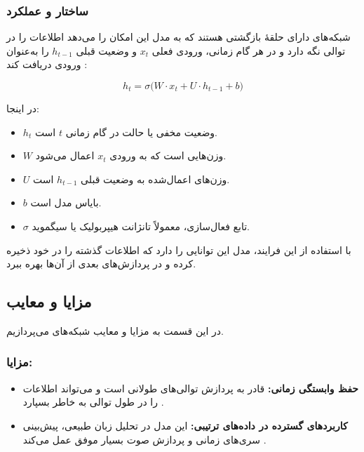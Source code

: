 \subsubsection{ساختار و عملکرد }
شبکه‌های  دارای حلقهٔ بازگشتی هستند که به مدل این امکان را می‌دهد اطلاعات را در توالی نگه دارد و در هر گام زمانی، ورودی فعلی \( x_t \) و وضعیت قبلی \( h_{t-1} \) را به‌عنوان ورودی دریافت کند
\cite{goodfellow2016deep}:

\begin{equation}
	h_t = \sigma \big( W \cdot x_t + U \cdot h_{t-1} + b \big)
\end{equation}

در اینجا:
\begin{itemize}
	\item \( h_t \) وضعیت مخفی یا حالت در گام زمانی \( t \) است.
	\item \( W \) وزن‌هایی است که به ورودی \( x_t \) اعمال می‌شود.
	\item \( U \) وزن‌های اعمال‌شده به وضعیت قبلی \( h_{t-1} \) است.
	\item \( b \) بایاس مدل است.
	\item \( \sigma \) تابع فعال‌سازی، معمولاً تانژانت هیپربولیک یا سیگموید.
\end{itemize}

با استفاده از این فرایند، مدل این توانایی را دارد که اطلاعات گذشته را در خود ذخیره کرده و در پردازش‌های بعدی از آن‌ها بهره ببرد.

\subsection{مزایا و معایب }
در این قسمت به مزایا و معایب شبکه‌های  می‌پردازیم.

\subsubsection{مزایا:}
\begin{itemize}
	\item \textbf{حفظ وابستگی زمانی:}  
	 قادر به پردازش توالی‌های طولانی است و می‌تواند اطلاعات را در طول توالی به خاطر بسپارد
	\cite{elman1990finding}.
	
	\item \textbf{کاربردهای گسترده در داده‌های ترتیبی:}  
	این مدل در تحلیل زبان طبیعی، پیش‌بینی سری‌های زمانی و پردازش صوت بسیار موفق عمل می‌کند
	\cite{gers1999learning}.
\end{itemize}

